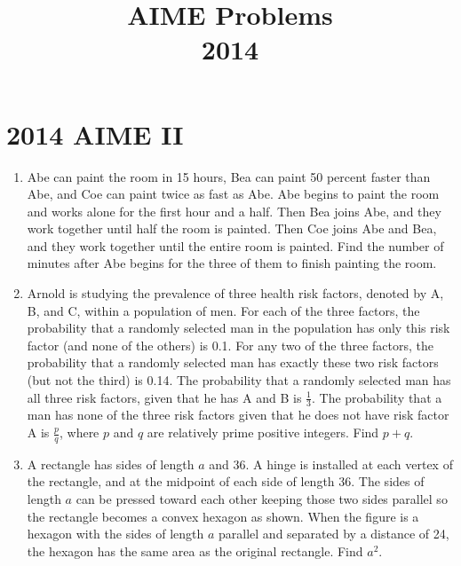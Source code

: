\documentclass{article}
\title{AIME Problems \\ 2014}
\date{}
\begin{document}
\maketitle\thispagestyle{fancy}\newpage\section*{2014 AIME II}\begin{enumerate}[label=\arabic*., itemsep=0.5em]\item Abe can paint the room in 15 hours, Bea can paint 50 percent faster than Abe, and Coe can paint twice as fast as Abe. Abe begins to paint the room and works alone for the first hour and a half. Then Bea joins Abe, and they work together until half the room is painted. Then Coe joins Abe and Bea, and they work together until the entire room is painted. Find the number of minutes after Abe begins for the three of them to finish painting the room.\par \vspace{0.5em}\item Arnold is studying the prevalence of three health risk factors, denoted by A, B, and C, within a population of men. For each of the three factors, the probability that a randomly selected man in the population has only this risk factor (and none of the others) is 0.1. For any two of the three factors, the probability that a randomly selected man has exactly these two risk factors (but not the third) is 0.14. The probability that a randomly selected man has all three risk factors, given that he has A and B is \(\frac{1}{3}\). The probability that a man has none of the three risk factors given that he does not have risk factor A is \(\frac{p}{q}\), where \(p\) and \(q\) are relatively prime positive integers. Find \(p+q\).\par \vspace{0.5em}\item A rectangle has sides of length \(a\) and 36. A hinge is installed at each vertex of the rectangle, and at the midpoint of each side of length 36. The sides of length \(a\) can be pressed toward each other keeping those two sides parallel so the rectangle becomes a convex hexagon as shown. When the figure is a hexagon with the sides of length \(a\) parallel and separated by a distance of 24, the hexagon has the same area as the original rectangle. Find \(a^2\). 




\end{enumerate}
\end{document}
